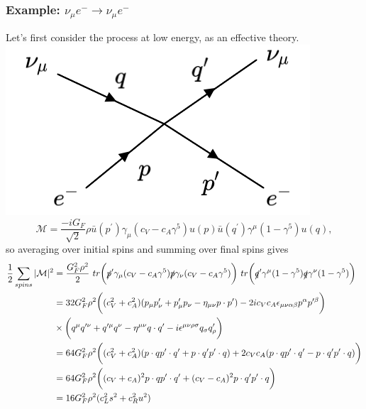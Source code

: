 \documentclass[a4paper,12pt]{article}
\begin{document}
\subsubsection{Example: $\nu_\mu e^- \to \nu_\mu e^-$}
%
Let's first consider the process at low energy, as an effective theory.
\newline
  \includegraphics[width=0.4\linewidth]{figs/24b.png}
\newline
\begin{equation}
\mathcal{M} = \frac{-iG_F}{\sqrt{2}} \rho \bar{u}(p^\prime) \gamma_\mu(c_V - c_A \gamma^5) u(p) \bar{u}(q^\prime) \gamma^\mu (1-\gamma^5) u(q),
\end{equation}
so averaging over initial spins and summing over final spins gives
\begin{equation}
\begin{split}
\frac{1}{2}\sum_{spins}|\mathcal{M}|^2 &= \frac{G_F^2\rho^2}{2}\ tr \bigg(\slashed{p}^\prime \gamma_\mu(c_V-c_A\gamma^5)\slashed{p}\gamma_\nu(c_V-c_A \gamma^5)\bigg)\ tr \bigg(\slashed{q}^\prime \gamma^\mu(1-\gamma^5)\slashed{q}\gamma^\nu(1-\gamma^5)\bigg) \\
&= 32G_F^2 \rho^2 \bigg( (c_V^2+c_A^2)(p_\mu p^\prime_\nu + p^\prime_\mu p_\nu - \eta_{\mu \nu} p\cdot p^\prime) - 2ic_Vc_A \epsilon_{\mu \nu \alpha \beta}p^\alpha p^{\prime \beta}\bigg) \\
&\times \bigg(q^\mu q^{\prime \nu} + q^{\prime \mu} q^\nu -\eta^{\mu \nu} q \cdot q^\prime - i\epsilon^{\mu \nu \rho \sigma}q_\sigma q^\prime_\rho \bigg) \\
&= 64G_F^2 \rho^2 \bigg( (c_V^2+c_A^2)(p \cdot q p^\prime \cdot q^\prime + p\cdot q^\prime p^\prime \cdot q) + 2c_Vc_A(p \cdot q p^\prime \cdot q^\prime - p\cdot q^\prime p^\prime \cdot q) \bigg) \\
&= 64G_F^2 \rho^2 \bigg((c_V+c_A)^2 p \cdot q p^\prime \cdot q^\prime + (c_V-c_A)^2 p \cdot q^\prime p^\prime \cdot q \bigg) \\
&= 16 G_F^2\rho^2(c_L^2s^2 + c_R^2u^2)
\end{split}
\end{equation}
\end{document}
